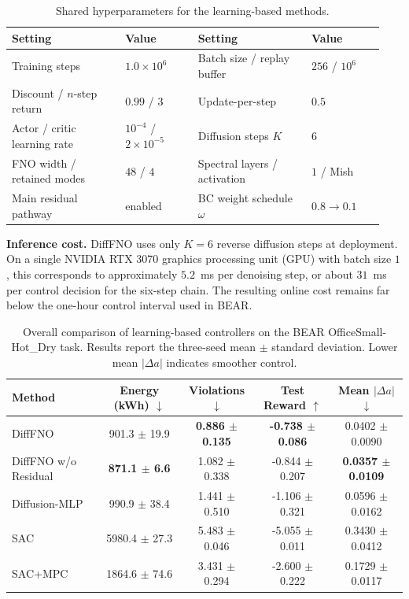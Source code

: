﻿\documentclass[conference]{IEEEtran}
\theoremstyle{nonumberplain}
\theoremstyle{plain}
\begin{document}
\begin{table}[t]
\centering
\caption{Shared hyperparameters for the learning-based methods.}
\label{tab:training_setup}
\scriptsize
\setlength{\tabcolsep}{3.5pt}
\renewcommand{\arraystretch}{1.04}
\begin{tabular}{>{\raggedright\arraybackslash}p{0.29\linewidth}>{\raggedright\arraybackslash}p{0.18\linewidth}>{\raggedright\arraybackslash}p{0.29\linewidth}>{\raggedright\arraybackslash}p{0.18\linewidth}}
\toprule
Setting & Value & Setting & Value \\
\midrule
Training steps & $1.0\times 10^6$ & Batch size / replay buffer & $256$ / $10^6$ \\
Discount / $n$-step return & $0.99$ / $3$ & Update-per-step & $0.5$ \\
Actor / critic learning rate & $10^{-4}$ / $2\times 10^{-5}$ & Diffusion steps $K$ & $6$ \\
FNO width / retained modes & $48$ / $4$ & Spectral layers / activation & $1$ / Mish \\
Main residual pathway & enabled & BC weight schedule $\omega$ & $0.8 \rightarrow 0.1$ \\
\bottomrule
\end{tabular}
\end{table}

\textbf{Inference cost.} DiffFNO uses only $K=6$ reverse diffusion steps at deployment. On a single NVIDIA RTX 3070 graphics processing unit (GPU) with batch size $1$, this corresponds to approximately $5.2$~ms per denoising step, or about $31$~ms per control decision for the six-step chain. The resulting online cost remains far below the one-hour control interval used in BEAR.

\begin{table}[!t]
\centering
\caption{Overall comparison of learning-based controllers on the BEAR OfficeSmall-Hot\_Dry task. Results report the three-seed mean $\pm$ standard deviation. Lower mean $|\Delta a|$ indicates smoother control.}
\label{tab:overall_results}
\footnotesize
\setlength{\tabcolsep}{4.5pt}
\renewcommand{\arraystretch}{1.10}
\begin{tabular}{lcccc}
\hline
Method & Energy (kWh) $\downarrow$ & Violations $\downarrow$ & Test Reward $\uparrow$ & Mean $|\Delta a|$ $\downarrow$ \\
\hline
DiffFNO & 901.3 $\pm$ 19.9 & \textbf{0.886 $\pm$ 0.135} & \textbf{-0.738 $\pm$ 0.086} & 0.0402 $\pm$ 0.0090 \\
DiffFNO w/o Residual & \textbf{871.1 $\pm$ 6.6} & 1.082 $\pm$ 0.338 & -0.844 $\pm$ 0.207 & \textbf{0.0357 $\pm$ 0.0109} \\
Diffusion-MLP & 990.9 $\pm$ 38.4 & 1.441 $\pm$ 0.510 & -1.106 $\pm$ 0.321 & 0.0596 $\pm$ 0.0162 \\
SAC & 5980.4 $\pm$ 27.3 & 5.483 $\pm$ 0.046 & -5.055 $\pm$ 0.011 & 0.3430 $\pm$ 0.0412 \\
SAC+MPC & 1864.6 $\pm$ 74.6 & 3.431 $\pm$ 0.294 & -2.600 $\pm$ 0.222 & 0.1729 $\pm$ 0.0117 \\
\hline
\end{tabular}
\end{table}
\end{document}
